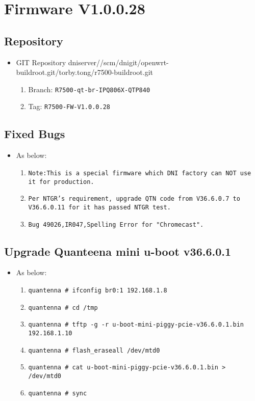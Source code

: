 \documentclass[12pt]{report}
\newcommand{\tlabel}[1]{
  \label{#1}%
  }
\begin{document}
\section{Firmware V1.0.0.28}

\tlabel{sec:1-0-1}
\subsection{Repository}
\begin{itemize}
	\item GIT Repository dniserver//scm/dnigit/openwrt-buildroot.git/torby.tong/r7500-buildroot.git
	\begin{enumerate}
		\item Branch: \texttt{R7500-qt-br-IPQ806X-QTP840}
                \item Tag: \texttt{R7500-FW-V1.0.0.28}
	\end{enumerate}
\end{itemize}

    \subsection{Fixed Bugs}
    \begin{itemize}
    \item As below:
    	\begin{enumerate}
		\item \texttt{Note:This is a special firmware which DNI factory can NOT use it for production.}
		\item \texttt{Per NTGR's requirement, upgrade QTN code from V36.6.0.7 to V36.6.0.11 for it has passed NTGR test.}
		\item \texttt{Bug 49026,IR047,Spelling Error for "Chromecast".}
    	\end{enumerate}
    \end{itemize}

    \subsection{Upgrade Quanteena mini u-boot v36.6.0.1}
    \begin{itemize}
    \item As below:
    	\begin{enumerate}
		\item \texttt{quantenna \# ifconfig br0:1 192.168.1.8}
		\item \texttt{quantenna \# cd /tmp}
		\item \texttt{quantenna \# tftp -g -r u-boot-mini-piggy-pcie-v36.6.0.1.bin 192.168.1.10}
		\item \texttt{quantenna \# flash\_eraseall /dev/mtd0}
		\item \texttt{quantenna \# cat u-boot-mini-piggy-pcie-v36.6.0.1.bin > /dev/mtd0}
		\item \texttt{quantenna \# sync}
    	\end{enumerate}
    \end{itemize}
\end{document}
